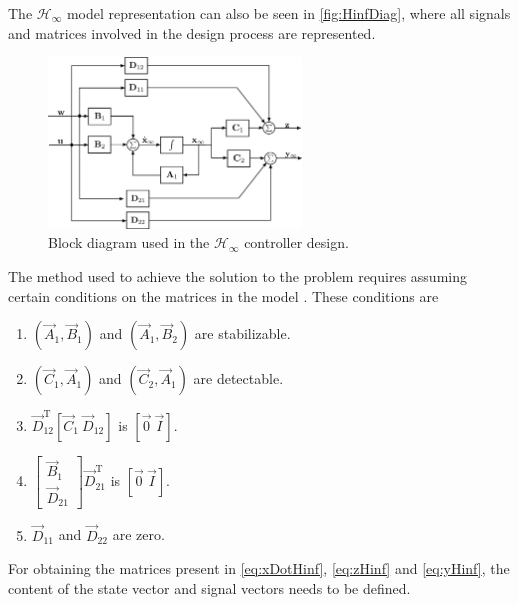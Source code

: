 The $\mathcal{H}_\infty$ model representation can also be seen in \autoref{fig:HinfDiag}, where all signals and matrices involved in the design process are represented.
\begin{figure}[H]
	\includegraphics[width=0.6\textwidth]{figures/HinfDiag}
	\caption{Block diagram used in the $\mathcal{H}_\infty$ controller design.}
	\label{fig:HinfDiag}
\end{figure}

The method used to achieve the solution to the problem requires assuming certain conditions on the matrices in the model \cite[p. 835]{JCDoyle}. These conditions are 
\begin{enumerate}
	\item $\left (\vec{A}_1,\vec{B}_1 \right)$ and $\left( \vec{A}_1, \vec{B}_2 \right)$ are stabilizable.
	\item $\left (\vec{C}_1,\vec{A}_1 \right)$ and $\left( \vec{C}_2, \vec{A}_1 \right)$ are detectable.
	\item $\vec{D}_{12}^\mathrm{T}[\vec{C}_1\ \vec{D}_{12}]$ is $[\vec{0}\ \vec{I}]$.
	\item $\begin{bmatrix}
				\vec{B}_1 \\
				\vec{D}_{21} 
			\end{bmatrix}\vec{D}_{21}^\mathrm{T}$ is $[\vec{0}\ \vec{I}]$.
	\item $\vec{D}_{11}$ and $\vec{D}_{22}$ are zero.
\end{enumerate}

For obtaining the matrices present in \autoref{eq:xDotHinf}, \ref{eq:zHinf} and \ref{eq:yHinf}, the content of the state vector and signal vectors needs to be defined.

